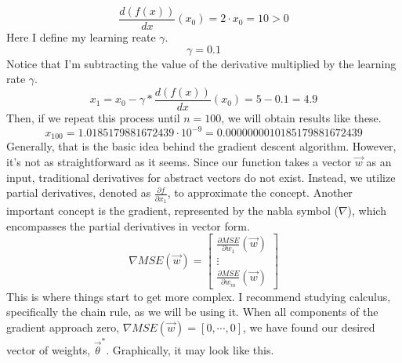 \[
\frac{d(f(x))}{dx}(x_0) = 2 \cdot x_0 = 10 > 0
\]
Here I define my learning reate $\gamma$.
\[
\gamma = 0.1
\]
Notice that I'm subtracting the value of the derivative multiplied by the learning rate $\gamma$.
\[
x_1 = x_0 - \gamma * \frac{d(f(x))}{dx}(x_0) = 5 - 0.1 = 4.9
\]
Then, if we repeat this process until $n = 100$, we will obtain results like these.
\[
x_{100} = 1.0185179881672439\cdot10^{-9} = 0.0000000010185179881672439
\]
Generally, that is the basic idea behind the gradient descent algorithm. However, it's not as straightforward
as it seems. Since our function takes a vector $\vec{w}$ as an input, traditional derivatives for abstract
vectors do not exist. Instead, we utilize partial derivatives, denoted as $\frac{\partial f}{\partial x_1}$,
to approximate the concept. Another important concept is the gradient, represented by the nabla symbol
($\nabla$), which encompasses the partial derivatives in vector form.
\[
\nabla MSE(\vec{w}) =
\begin{bmatrix} \frac{\partial MSE}{\partial w_1}(\vec{w})
  \\ \vdots
  \\ \frac{\partial MSE}{\partial w_m}(\vec{w})
\end{bmatrix}
\]
This is where things start to get more complex. I recommend studying calculus, specifically the chain rule,
as we will be using it. When all components of the gradient approach zero,
$\nabla MSE(\vec{w}) = [0, \cdots, 0]$, we have found our desired vector of weights, $\vec{\theta}^*$.
Graphically, it may look like this.

\begin{center}
\end{center}

